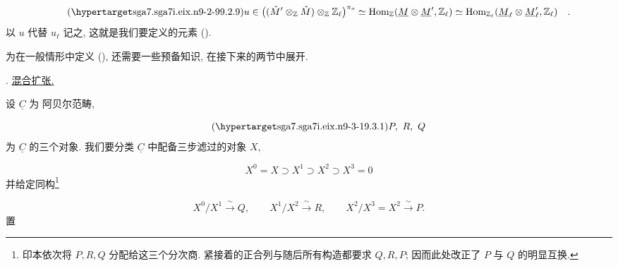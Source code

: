 \begin{equation}\tag{\SGARefTarget{sga7.sga7i.eix.n9-2-9}{9.2.9}}
u\in
\bigl((\check M'\otimes_{\mathbb{Z}}\check M)
 \otimes_{\mathbb{Z}}\mathbb{Z}_{\ell}\bigr)^{\pi_o}
\simeq
\operatorname{Hom}_{\mathbb{Z}}
 (\underline M\otimes\underline M',\mathbb{Z}_{\ell})
\simeq
\operatorname{Hom}_{\mathbb{Z}_{\ell}}
 (\underline M_{\ell}\otimes\underline M'_{\ell},
  \mathbb{Z}_{\ell}) \quad .
\end{equation}
以 $u$ 代替 $u_{\ell}$ 记之, 这就是我们要定义的元素 ().

为在一般情形中定义 (), 还需要一些预备知识, 在接下来的两节中展开.



\medskip
\noindent
{}. \underline{混合扩张.}

设 $\underline C$ 为 阿贝尔范畴,

\begin{equation}\tag{\SGARefTarget{sga7.sga7i.eix.n9-3-1}{9.3.1}}
P,\ R,\ Q
\end{equation}
为 $\underline C$ 的三个对象. 我们要分类 $\underline C$ 中配备三步滤过的对象 $X$,

\begin{equation}\tag{*}
X^0=X\supset X^1\supset X^2\supset X^3=0
\end{equation}
并给定同构\footnote{印本依次将 $P,R,Q$ 分配给这三个分次商. 紧接着的正合列与随后所有构造都要求 $Q,R,P$; 因而此处改正了 $P$ 与 $Q$ 的明显互换.}

\begin{equation*}
X^0/X^1\xrightarrow{\ \sim\ }Q,
\qquad X^1/X^2\xrightarrow{\ \sim\ }R,
\qquad X^2/X^3=X^2\xrightarrow{\ \sim\ }P.
\end{equation*}
置

